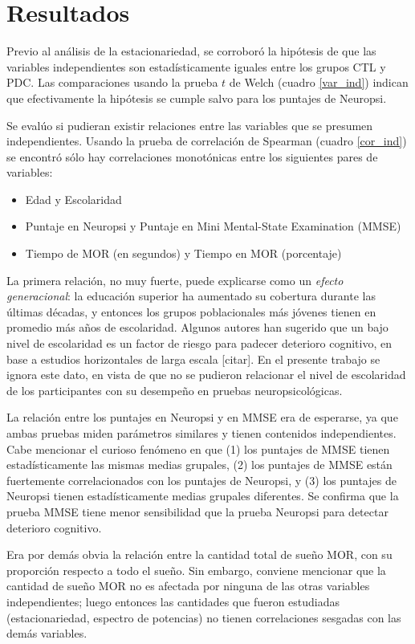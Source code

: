 \chapter{Resultados}

Previo al análisis de la estacionariedad, se corroboró la hipótesis de que las variables 
independientes son estadísticamente iguales entre los grupos CTL y PDC. Las comparaciones
usando la prueba $t$ de Welch (cuadro \ref{var_ind}) indican que efectivamente la hipótesis se cumple salvo
para los puntajes de Neuropsi.

Se evalúo si pudieran existir relaciones entre las variables que se presumen independientes.
Usando la prueba de correlación de Spearman (cuadro \ref{cor_ind}) se encontró sólo hay 
correlaciones monotónicas entre los siguientes pares de variables:
\begin{itemize}
\item Edad y Escolaridad
\item Puntaje en Neuropsi y Puntaje en Mini Mental-State Examination (MMSE)
\item Tiempo de MOR (en segundos) y Tiempo en MOR (porcentaje)
\end{itemize}

La primera relación, no muy fuerte, puede explicarse como un \textit{efecto generacional}: la educación 
superior ha aumentado su cobertura durante las últimas décadas, y entonces los grupos poblacionales 
más jóvenes tienen en promedio más años de escolaridad. 
%
Algunos autores han sugerido que un bajo nivel de escolaridad es un factor de riesgo para padecer
deterioro cognitivo, en base a estudios horizontales de larga escala [citar].
%
En el presente trabajo se ignora este dato, en vista de que no se pudieron relacionar el nivel de 
escolaridad de los participantes con su desempeño en pruebas neuropsicológicas.

La relación entre los puntajes en Neuropsi y en MMSE era de esperarse, ya que ambas pruebas miden
parámetros similares y tienen contenidos independientes. Cabe mencionar el curioso fenómeno en que (1) 
los puntajes de MMSE
tienen estadísticamente las mismas medias grupales, (2) los puntajes de MMSE están 
fuertemente correlacionados con los puntajes de Neuropsi, y (3) los puntajes de Neuropsi
tienen estadísticamente medias grupales diferentes. Se confirma que la prueba MMSE
tiene menor sensibilidad que la prueba Neuropsi para detectar deterioro cognitivo.

Era por demás obvia la relación entre la cantidad total de sueño MOR, con su proporción respecto a 
todo el sueño. Sin embargo, conviene mencionar que la cantidad de sueño MOR no es afectada por
ninguna de las otras variables independientes; luego entonces las cantidades que fueron estudiadas
(estacionariedad, espectro de potencias) no tienen correlaciones sesgadas con las demás variables.

